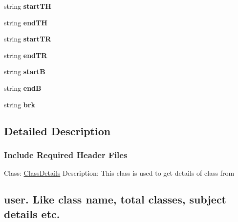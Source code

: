 \begin{DoxyCompactItemize}
\item 
\hypertarget{classHTMLTags_a71b8a6e9593c6744f75fe8fac83e39b7}{string {\bfseries start\-T\-H}}\label{classHTMLTags_a71b8a6e9593c6744f75fe8fac83e39b7}

\item 
\hypertarget{classHTMLTags_a12cc718fee6ac4d701aafa9bc6303ad3}{string {\bfseries end\-T\-H}}\label{classHTMLTags_a12cc718fee6ac4d701aafa9bc6303ad3}

\item 
\hypertarget{classHTMLTags_ae8ee5ce9589d18b36263d62c6aa30e0a}{string {\bfseries start\-T\-R}}\label{classHTMLTags_ae8ee5ce9589d18b36263d62c6aa30e0a}

\item 
\hypertarget{classHTMLTags_ae6b79efff5ed7c253a050a6179057942}{string {\bfseries end\-T\-R}}\label{classHTMLTags_ae6b79efff5ed7c253a050a6179057942}

\item 
\hypertarget{classHTMLTags_ac6dafb63a2da3f7500cc080fd43a324d}{string {\bfseries start\-B}}\label{classHTMLTags_ac6dafb63a2da3f7500cc080fd43a324d}

\item 
\hypertarget{classHTMLTags_a12fc9d60d71c585cfba1643dc93eb8fc}{string {\bfseries end\-B}}\label{classHTMLTags_a12fc9d60d71c585cfba1643dc93eb8fc}

\item 
\hypertarget{classHTMLTags_a4403658fc74b6064bac61b0785ff0e85}{string {\bfseries brk}}\label{classHTMLTags_a4403658fc74b6064bac61b0785ff0e85}

\end{DoxyCompactItemize}


\subsection{Detailed Description}


 \subsubsection*{Include Required Header Files}



 Class\-: \hyperlink{classClassDetails}{Class\-Details} Description\-: This class is used to get details of class from \subsection*{user. Like class name, total classes, subject details etc.}

